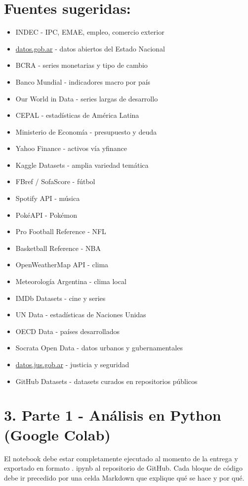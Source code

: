 \documentclass[10pt]{article}
\begin{document}
\section*{Fuentes sugeridas:}
\begin{itemize}
  \item INDEC - IPC, EMAE, empleo, comercio exterior
  \item \href{http://datos.gob.ar}{datos.gob.ar} - datos abiertos del Estado Nacional
  \item BCRA - series monetarias y tipo de cambio
  \item Banco Mundial - indicadores macro por país
  \item Our World in Data - series largas de desarrollo
  \item CEPAL - estadísticas de América Latina
  \item Ministerio de Economía - presupuesto y deuda
  \item Yahoo Finance - activos vía yfinance
  \item Kaggle Datasets - amplia variedad temática
  \item FBref / SofaScore - fútbol
  \item Spotify API - música
  \item PokéAPI - Pokémon
  \item Pro Football Reference - NFL
  \item Basketball Reference - NBA
  \item OpenWeatherMap API - clima
  \item Meteorología Argentina - clima local
  \item IMDb Datasets - cine y series
  \item UN Data - estadísticas de Naciones Unidas
  \item OECD Data - países desarrollados
  \item Socrata Open Data - datos urbanos y gubernamentales
  \item \href{http://datos.jus.gob.ar}{datos.jus.gob.ar} - justicia y seguridad
  \item GitHub Datasets - datasets curados en repositorios públicos
\end{itemize}

\section*{3. Parte 1 - Análisis en Python (Google Colab)}
El notebook debe estar completamente ejecutado al momento de la entrega y exportado en formato . ipynb al repositorio de GitHub. Cada bloque de código debe ir precedido por una celda Markdown que explique qué se hace y por qué.
\end{document}
